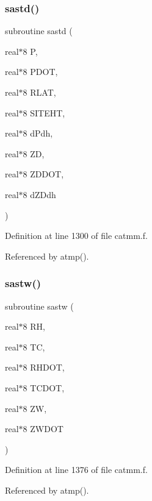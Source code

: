 \subsubsection{\texorpdfstring{sastd()}{sastd()}}
{\footnotesize\ttfamily subroutine sastd (\begin{DoxyParamCaption}\item[{real$\ast$8}]{P,  }\item[{real$\ast$8}]{P\+D\+OT,  }\item[{real$\ast$8}]{R\+L\+AT,  }\item[{real$\ast$8}]{S\+I\+T\+E\+HT,  }\item[{real$\ast$8}]{d\+Pdh,  }\item[{real$\ast$8}]{ZD,  }\item[{real$\ast$8}]{Z\+D\+D\+OT,  }\item[{real$\ast$8}]{d\+Z\+Ddh }\end{DoxyParamCaption})}



Definition at line 1300 of file catmm.\+f.



Referenced by atmp().

\mbox{\label{catmm_8f_a932e6b52a7f43de7069f6c44d5d4deb2}} 
\subsubsection{\texorpdfstring{sastw()}{sastw()}}
{\footnotesize\ttfamily subroutine sastw (\begin{DoxyParamCaption}\item[{real$\ast$8}]{RH,  }\item[{real$\ast$8}]{TC,  }\item[{real$\ast$8}]{R\+H\+D\+OT,  }\item[{real$\ast$8}]{T\+C\+D\+OT,  }\item[{real$\ast$8}]{ZW,  }\item[{real$\ast$8}]{Z\+W\+D\+OT }\end{DoxyParamCaption})}



Definition at line 1376 of file catmm.\+f.



Referenced by atmp().

